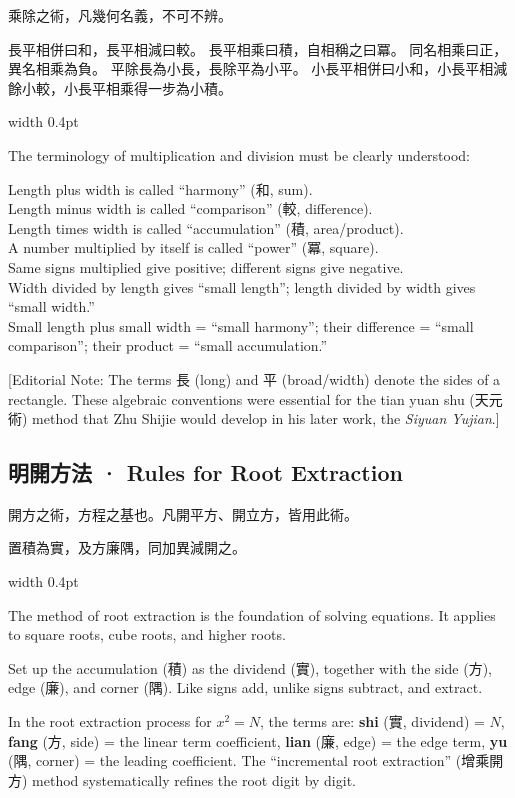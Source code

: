 \documentclass[10pt,a4paper]{article}
\newlength{\cnwidth}
\newlength{\enwidth}
\newcommand{\bilingual}[2]{%
  \noindent%
  \begin{minipage}[t]{\cnwidth}%
    #1%
  \end{minipage}%
  \hfill\vrule width 0.4pt\hfill%
  \begin{minipage}[t]{\enwidth}%
    #2%
  \end{minipage}%
  \par\smallskip%
}
\newcommand{\bilingualsubsection}[2]{%
  \subsection*{#1 · #2}
}
\newcommand{\transnote}[1]{%
  \par\smallskip\noindent\textcolor{notecolor}{\small[Editorial Note: #1]}\par\smallskip
}
\begin{document}
\bilingual{%
  乘除之術，凡幾何名義，不可不辨。

  長平相併曰和，長平相減曰較。
  長平相乘曰積，自相稱之曰冪。
  同名相乘曰正，異名相乘為負。
  平除長為小長，長除平為小平。
  小長平相併曰小和，小長平相減餘小較，小長平相乘得一步為小積。
}{%
  The terminology of multiplication and division must be clearly understood:

  Length plus width is called ``harmony'' (和, sum).\\
  Length minus width is called ``comparison'' (較, difference).\\
  Length times width is called ``accumulation'' (積, area/product).\\
  A number multiplied by itself is called ``power'' (冪, square).\\
  Same signs multiplied give positive; different signs give negative.\\
  Width divided by length gives ``small length''; length divided by width gives ``small width.''\\
  Small length plus small width = ``small harmony''; their difference = ``small comparison'';
  their product = ``small accumulation.''
}

\transnote{The terms 長 (long) and 平 (broad/width) denote the sides of a rectangle.
These algebraic conventions were essential for the tian yuan shu (天元術) method
that Zhu Shijie would develop in his later work, the \textit{Siyuan Yujian}.}

\bilingualsubsection{明開方法}{Rules for Root Extraction}

\bilingual{%
  開方之術，方程之基也。凡開平方、開立方，皆用此術。

  置積為實，及方廉隅，同加異減開之。
}{%
  The method of root extraction is the foundation of solving equations.
  It applies to square roots, cube roots, and higher roots.

  Set up the accumulation (積) as the dividend (實), together with the side (方),
  edge (廉), and corner (隅). Like signs add, unlike signs subtract, and extract.

  In the root extraction process for $x^2 = N$, the terms are:
  \textbf{shi} (實, dividend) = $N$,
  \textbf{fang} (方, side) = the linear term coefficient,
  \textbf{lian} (廉, edge) = the edge term,
  \textbf{yu} (隅, corner) = the leading coefficient.
  The ``incremental root extraction'' (增乘開方) method systematically
  refines the root digit by digit.
}
\end{document}
